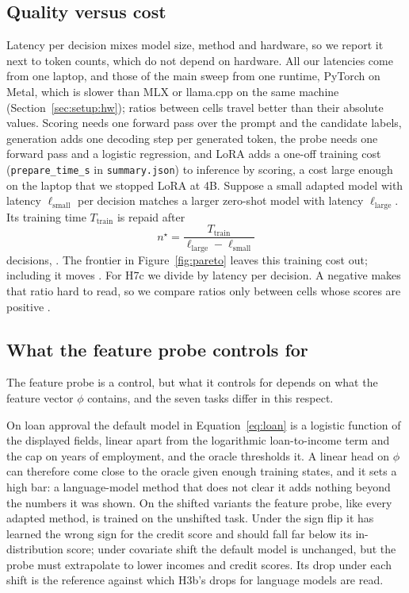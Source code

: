 \subsection{Quality versus cost}
\label{sec:analysis:cost}

Latency per decision mixes model size, method and hardware, so we report it next to token counts, which do not depend on hardware. All our latencies come from one laptop, and those of the main sweep from one runtime, PyTorch on Metal, which is slower than MLX or llama.cpp on the same machine (Section~\ref{sec:setup:hw}); ratios between cells travel better than their absolute values. Scoring needs one forward pass over the prompt and the candidate labels, generation adds one decoding step per generated token, the probe needs one forward pass and a logistic regression, and LoRA adds a one-off training cost (\texttt{prepare\_time\_s} in \texttt{summary.json}) to inference by scoring, a cost large enough on the laptop that we stopped LoRA at 4B. Suppose a small adapted model with latency $\ell_{\text{small}}$ per decision matches a larger zero-shot model with latency $\ell_{\text{large}}$. Its training time $T_{\text{train}}$ is repaid after
\begin{equation}
n^\star = \frac{T_{\text{train}}}{\ell_{\text{large}}-\ell_{\text{small}}}
\end{equation}
decisions, . The frontier in Figure~\ref{fig:pareto} leaves this training cost out; including it moves . For H7c we divide \norm{} by latency per decision. A negative \norm{} makes that ratio hard to read, so we compare ratios only between cells whose scores are positive .

\subsection{What the feature probe controls for}
\label{sec:analysis:feature}

The feature probe is a control, but what it controls for depends on what the feature vector $\phi$ contains, and the seven tasks differ in this respect.

On loan approval the default model in Equation~\eqref{eq:loan} is a logistic function of the displayed fields, linear apart from the logarithmic loan-to-income term and the cap on years of employment, and the oracle thresholds it. A linear head on $\phi$ can therefore come close to the oracle given enough training states, and it sets a high bar: a language-model method that does not clear it adds nothing beyond the numbers it was shown. On the shifted variants the feature probe, like every adapted method, is trained on the unshifted task. Under the sign flip it has learned the wrong sign for the credit score and should fall far below its in-distribution score; under covariate shift the default model is unchanged, but the probe must extrapolate to lower incomes and credit scores. Its drop under each shift is the reference against which H3b's drops for language models are read.

